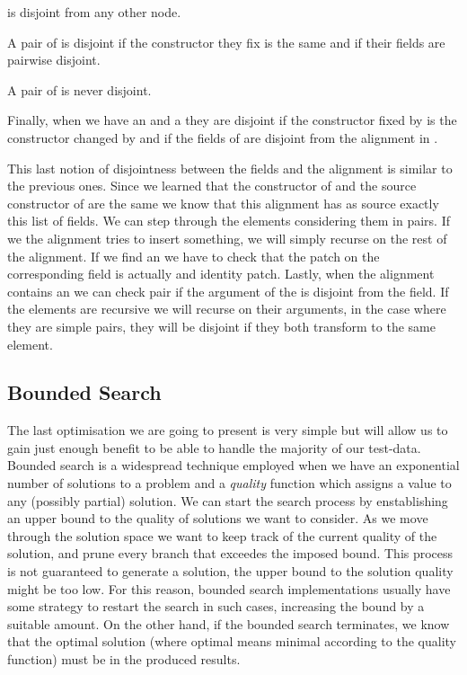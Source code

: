 \documentclass[11pt]{article}
\begin{document}
\scp is disjoint from any other node. 

A pair of \scns is disjoint if the constructor they fix is the same and if their 
fields are pairwise disjoint.

A pair of \schg is never disjoint.

Finally, when we have an \scns and a \schg they are disjoint if the constructor 
fixed by \scns is the constructor changed by \schg and if the fields of \scns 
are disjoint from the alignment in \schg.



This last notion of disjointness between the fields and the alignment is similar to the previous ones.
Since we learned that the constructor of \scns and the source constructor of 
\schg are the same we know that this alignment has as source exactly this list 
of fields. We can step through the elements considering them in pairs. 
If we the 
alignment tries to insert something, we will simply recurse on the rest of the 
alignment. 
If we find an \adel we have to check that the patch on the corresponding field 
is actually and identity patch. 
Lastly, when the alignment contains an \amod we can check pair if the argument 
of the \amod is disjoint from the field. 
If the elements are recursive we will recurse on their arguments, in the case 
where they are simple pairs, they will be disjoint if they both transform to the 
same element.


\subsection{Bounded Search}\label{bd-search}

The last optimisation we are going to present is very simple but will allow us 
to gain just enough benefit to be able to handle the majority of our test-data. 
Bounded search is a widespread technique employed when we have an exponential 
number of solutions to a problem and a \emph{quality} function which assigns a value to 
any (possibly partial) solution. We can start the search process by 
enstablishing an upper bound to the quality of solutions we want to consider. As 
we move through the solution space we want to keep track of the current quality 
of the solution, and prune every branch that exceedes the imposed bound. 
This process is not guaranteed to generate a solution, the upper bound to the 
solution quality might be too low. For this reason, bounded search 
implementations usually have some strategy to restart the search in such cases, 
increasing the bound by a suitable amount. On the other hand, if the bounded 
search terminates, we know that the optimal solution (where optimal means minimal according to the quality function)
must be in the produced results.
\end{document}
